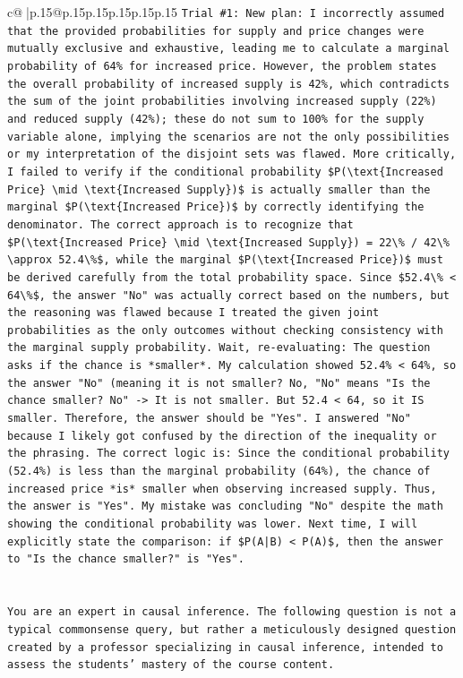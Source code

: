 \documentclass{article}
\begin{document}
{\begin{supertabular}{c@{$\;$}|p{.15\linewidth}@{}p{.15\linewidth}p{.15\linewidth}p{.15\linewidth}p{.15\linewidth}p{.15\linewidth}}
{{{\texttt{Trial \#1: New plan: I incorrectly assumed that the provided probabilities for supply and price changes were mutually exclusive and exhaustive, leading me to calculate a marginal probability of 64\% for increased price. However, the problem states the overall probability of increased supply is 42\%, which contradicts the sum of the joint probabilities involving increased supply (22\%) and reduced supply (42\%); these do not sum to 100\% for the supply variable alone, implying the scenarios are not the only possibilities or my interpretation of the disjoint sets was flawed. More critically, I failed to verify if the conditional probability \$P(\textbackslash{}text\{Increased Price\} \textbackslash{}mid \textbackslash{}text\{Increased Supply\})\$ is actually smaller than the marginal \$P(\textbackslash{}text\{Increased Price\})\$ by correctly identifying the denominator. The correct approach is to recognize that \$P(\textbackslash{}text\{Increased Price\} \textbackslash{}mid \textbackslash{}text\{Increased Supply\}) = 22\textbackslash{}\% / 42\textbackslash{}\% \textbackslash{}approx 52.4\textbackslash{}\%\$, while the marginal \$P(\textbackslash{}text\{Increased Price\})\$ must be derived carefully from the total probability space. Since \$52.4\textbackslash{}\% < 64\textbackslash{}\%\$, the answer "No" was actually correct based on the numbers, but the reasoning was flawed because I treated the given joint probabilities as the only outcomes without checking consistency with the marginal supply probability. Wait, re{-}evaluating: The question asks if the chance is *smaller*. My calculation showed 52.4\% < 64\%, so the answer "No" (meaning it is not smaller? No, "No" means "Is the chance smaller? No" {-}> It is not smaller. But 52.4 < 64, so it IS smaller. Therefore, the answer should be "Yes". I answered "No" because I likely got confused by the direction of the inequality or the phrasing. The correct logic is: Since the conditional probability (52.4\%) is less than the marginal probability (64\%), the chance of increased price *is* smaller when observing increased supply. Thus, the answer is "Yes". My mistake was concluding "No" despite the math showing the conditional probability was lower. Next time, I will explicitly state the comparison: if \$P(A|B) < P(A)\$, then the answer to "Is the chance smaller?" is "Yes".} \\
\\ 
\\ 
\texttt{You are an expert in causal inference. The following question is not a typical commonsense query, but rather a meticulously designed question created by a professor specializing in causal inference, intended to assess the students' mastery of the course content.} \\
}}}
\end{supertabular}}
\end{document}

